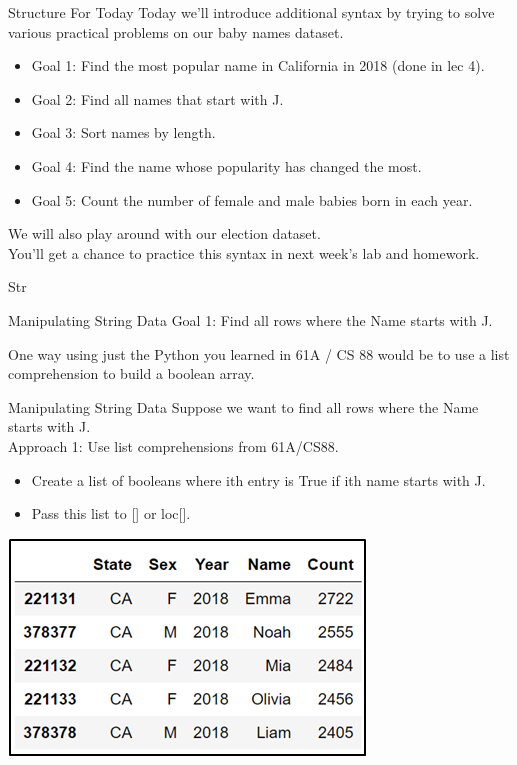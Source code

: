 \documentclass[aspectratio=169]{../latex_main/tntbeamer}  %
\begin{document}
	
	\begin{frame}[c]{Structure For Today}
	    Today we’ll introduce additional syntax by trying to solve various practical problems on our baby names dataset.

	    \begin{itemize}
	        \item Goal 1: Find the most popular name in California in 2018 (done in lec 4).
	        \item Goal 2: Find all names that start with J.
	        \item Goal 3: Sort names by length.
            \item Goal 4: Find the name whose popularity has changed the most.
            \item Goal 5: Count the number of female and male babies born in each year.
	    \end{itemize}
    
        We will also play around with our election dataset.\\
        You’ll get a chance to practice this syntax in next week’s lab and homework.

	\end{frame}
	
	
	
	\begin{frame}[c]{Str}

	\end{frame}
	
	
	\begin{frame}[c]{Manipulating String Data}
	    Goal 1: Find all rows where the Name starts with J.
	    
        One way using just the Python you learned in 61A / CS 88 would be to use a list comprehension to build a boolean array.
        
	\end{frame}
	
	
	\begin{frame}[c]{Manipulating String Data}
	    Suppose we want to find all rows where the Name starts with J.\\
	    Approach 1: Use list comprehensions from 61A/CS88.
	    \begin{itemize}
	        \item Create a list of booleans where ith entry is True if ith name starts with J.
	        \item Pass this list to [] or loc[].
	    \end{itemize}
        \hfill
        \includegraphics[scale=.75]{Bild1}
	\end{frame}
	
\end{document}
